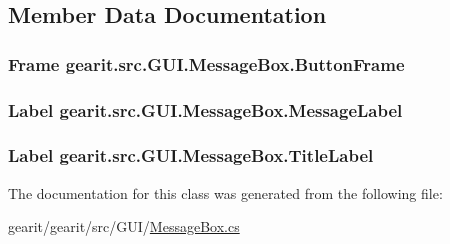 \subsection{Member Data Documentation}
\hypertarget{classgearit_1_1src_1_1_g_u_i_1_1_message_box_aa0a2cb0628b65f402993fc8d95136758}{
\subsubsection[{Button\+Frame}]{\setlength{\rightskip}{0pt plus 5cm}Frame gearit.\+src.\+G\+U\+I.\+Message\+Box.\+Button\+Frame}}\label{classgearit_1_1src_1_1_g_u_i_1_1_message_box_aa0a2cb0628b65f402993fc8d95136758}
\hypertarget{classgearit_1_1src_1_1_g_u_i_1_1_message_box_a7499a39d800473f8d2fb2a4c60c602c4}{
\subsubsection[{Message\+Label}]{\setlength{\rightskip}{0pt plus 5cm}Label gearit.\+src.\+G\+U\+I.\+Message\+Box.\+Message\+Label}}\label{classgearit_1_1src_1_1_g_u_i_1_1_message_box_a7499a39d800473f8d2fb2a4c60c602c4}
\hypertarget{classgearit_1_1src_1_1_g_u_i_1_1_message_box_a427aa0e453d98cf59ffabad81d61bda8}{
\subsubsection[{Title\+Label}]{\setlength{\rightskip}{0pt plus 5cm}Label gearit.\+src.\+G\+U\+I.\+Message\+Box.\+Title\+Label}}\label{classgearit_1_1src_1_1_g_u_i_1_1_message_box_a427aa0e453d98cf59ffabad81d61bda8}


The documentation for this class was generated from the following file\+:\begin{DoxyCompactItemize}
\item 
gearit/gearit/src/\+G\+U\+I/\hyperlink{_message_box_8cs}{Message\+Box.\+cs}\end{DoxyCompactItemize}
